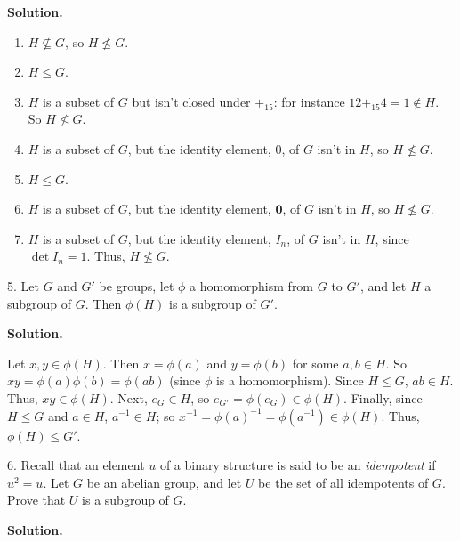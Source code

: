 \documentclass[10pt,]{book}
\theoremstyle{plain}
\theoremstyle{definition}
\theoremstyle{definition}
\theoremstyle{definition}
\theoremstyle{definition}
\numberwithin{equation}{section}
\def\0{\mathbf 0}
\begin{document}
\begin{exerciselist}
\par\smallskip
\par\smallskip
\noindent\textbf{Solution.}\hypertarget{solution-31}{}\quad
\leavevmode%
\begin{enumerate}[label=(\alph*)]
\item\hypertarget{li-236}{}
          \(H\not\subseteq G\), so \(H\not\leq G\).
\item\hypertarget{li-237}{}
          \(H\leq G\).
\item\hypertarget{li-238}{}
          \(H\) is a subset of \(G\) but isn't closed under \(+_{15}\): for instance \(12+_{15}4=1\not\in H\).  So \(H\not\leq G\).
\item\hypertarget{li-239}{}
          \(H\) is a subset of \(G\), but the identity element, 0, of \(G\) isn't in \(H\), so \(H\not\leq G\).
\item\hypertarget{li-240}{}
          \(H\leq G\).
\item\hypertarget{li-241}{}
          \(H\) is a subset of \(G\), but the identity element, \(\0\), of \(G\) isn't in \(H\), so \(H\not\leq G\).
\item\hypertarget{li-242}{}
          \(H\) is a subset of \(G\), but the identity element, \(I_n\), of \(G\) isn't in \(H\), since \(\det I_n=1\).  Thus, \(H\not\leq G\).
\end{enumerate}
\item[5.]\hypertarget{exercise-32}{}
        Let \(G\) and \(G'\) be groups, let \(\phi\) a homomorphism from \(G\) to \(G'\), and let \(H\) a subgroup of \(G\). Then \(\phi(H)\) is a subgroup of \(G'\).
\par\smallskip
\par\smallskip
\noindent\textbf{Solution.}\hypertarget{solution-32}{}\quad

      Let \(x,y\in \phi(H)\). Then \(x=\phi(a)\) and \(y=\phi(b)\) for some \(a,b\in H\). So \(xy=\phi(a)\phi(b)=\phi(ab)\) (since \(\phi\) is a homomorphism). Since \(H\leq G\), \(ab\in H\). Thus, \(xy\in \phi(H)\). Next, \(e_G\in H\), so \(e_{G'}=\phi(e_G)\in \phi(H)\). Finally, since \(H\leq G\) and \(a\in H\), \(a^{-1}\in H\); so \(x^{-1}=\phi(a)^{-1}=\phi(a^{-1}) \in \phi(H)\). Thus, \(\phi(H)\leq G'\).
\item[6.]\hypertarget{exercise-33}{}
        Recall that an element \(u\) of a binary structure is said to be an \emph{idempotent} if \(u^2=u\). Let \(G\) be an abelian group, and let \(U\) be the set of all idempotents of \(G\). Prove that \(U\) is a subgroup of \(G\).
\par\smallskip
\par\smallskip
\noindent\textbf{Solution.}\hypertarget{solution-33}{}\quad


\end{exerciselist}
\end{document}
